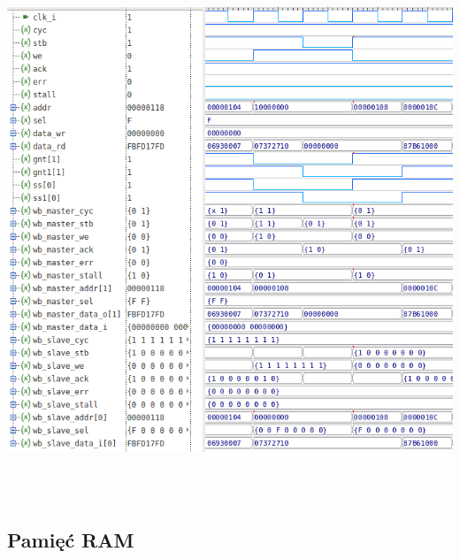 \documentclass[11pt,a4paper]{article}
\begin{document}
			\begin{minipage}{\textwidth}
				\begin{center}
					\includegraphics[height=16cm,width=14cm,keepaspectratio]{./rysunki/wishbone_timing.png}
				\end{center}
			\end{minipage} 
	\subsection{Pamięć RAM}
\end{document}

